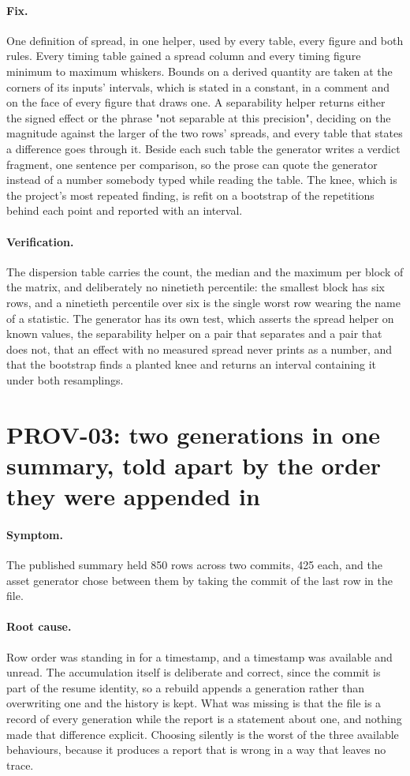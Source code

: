 \documentclass[11pt,a4paper]{report}
\newcommand{\symptom}[1]{\paragraph{Symptom.}#1}
\newcommand{\rootcause}[1]{\paragraph{Root cause.}#1}
\newcommand{\fix}[1]{\paragraph{Fix.}#1}
\newcommand{\verification}[1]{\paragraph{Verification.}#1}
\begin{document}
\fix{One definition of spread, in one helper, used by every table, every figure
and both rules. Every timing table gained a spread column and every timing figure
minimum to maximum whiskers. Bounds on a derived quantity are taken at the
corners of its inputs' intervals, which is stated in a constant, in a comment and
on the face of every figure that draws one. A separability helper returns either
the signed effect or the phrase "not separable at this precision", deciding on
the magnitude against the larger of the two rows' spreads, and every table that
states a difference goes through it. Beside each such table the generator writes a
verdict fragment, one sentence per comparison, so the prose can quote the
generator instead of a number somebody typed while reading the table. The knee,
which is the project's most repeated finding, is refit on a bootstrap of the
repetitions behind each point and reported with an interval.}

\verification{The dispersion table carries the count, the median and the maximum
per block of the matrix, and deliberately no ninetieth percentile: the smallest
block has six rows, and a ninetieth percentile over six is the single worst row
wearing the name of a statistic. The generator has its own test, which asserts
the spread helper on known values, the separability helper on a pair that
separates and a pair that does not, that an effect with no measured spread never
prints as a number, and that the bootstrap finds a planted knee and returns an
interval containing it under both resamplings.}

\section{PROV-03: two generations in one summary, told apart by the order they were appended in}

\symptom{The published summary held 850 rows across two commits, 425 each, and
the asset generator chose between them by taking the commit of the last row in
the file.}

\rootcause{Row order was standing in for a timestamp, and a timestamp was
available and unread. The accumulation itself is deliberate and correct, since
the commit is part of the resume identity, so a rebuild appends a generation
rather than overwriting one and the history is kept. What was missing is that the
file is a record of every generation while the report is a statement about one,
and nothing made that difference explicit. Choosing silently is the worst of the
three available behaviours, because it produces a report that is wrong in a way
that leaves no trace.}
\end{document}

